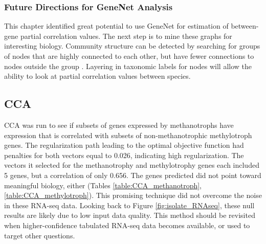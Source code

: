 \subsubsection{Future Directions for GeneNet Analysis}

This chapter identified great potential to use GeneNet for estimation of between-gene partial correlation values.
The next step is to mine these graphs for interesting biology.
Community structure can be detected by searching for groups of nodes that are highly connected to each other, but have fewer connections to nodes outside the group \cite{girvan2002}.
Layering in taxonomic labels for nodes will allow the ability to look at partial correlation values between species.



\subsection{CCA}

CCA was run to see if subsets of genes expressed by methanotrophs have expression that is correlated with subsets of non-methanotrophic methylotroph genes.
The regularization path leading to the optimal objective function had penalties for both vectors equal to 0.026, indicating high regularization.
The vectors it selected for the methanotrophy and methylotrophy genes each included 5 genes, but a correlation of only 0.656.
The genes predicted did not point toward meaningful biology, either (Tables \ref{table:CCA_methanotroph}, \ref{table:CCA_methylotroph}).
This promising technique did not overcome the noise in these RNA-seq data.
Looking back to Figure \ref{fig:isolate_RNAseq}, these null results are likely due to low input data quality.
This method should be revisited when higher-confidence tabulated RNA-seq data becomes available, or used to target other questions.

